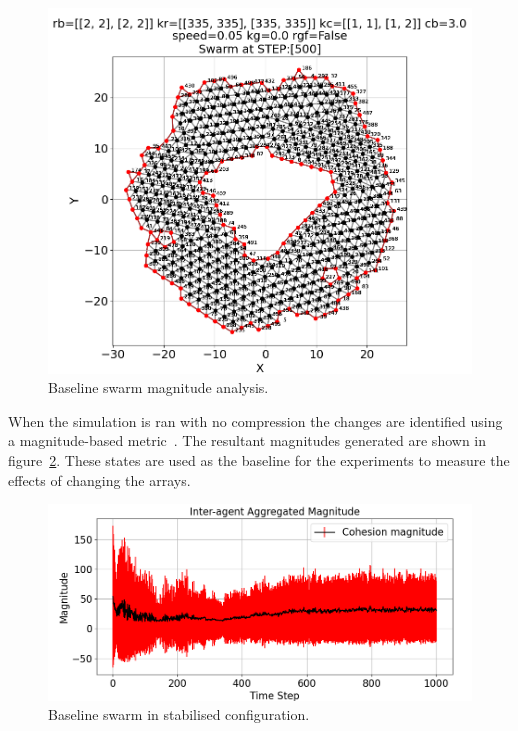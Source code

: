 \documentclass[12pt,a4paper]{IEEEtran}
\begin{document}
\begin{figure}[H]
	\begin{center}
		\includegraphics[width=1.0\linewidth]{figures/baseline}
	\end{center}
	\caption{Baseline swarm magnitude analysis. \label{fig:baselineSwarm}}
\end{figure}

When the simulation is ran with no compression the changes are identified using a magnitude-based metric~\cite{eliot2018metric}. The resultant magnitudes generated are shown in figure~\ref{fig:baselineMagnitude}. These states are used as the baseline for the experiments to measure the effects of changing the arrays.

\begin{figure}[H]
	\begin{center}
		\includegraphics[width=1.0\linewidth]{figures/baselineMagnitude}
	\end{center}
	\caption{Baseline swarm in stabilised configuration. \label{fig:baselineMagnitude}}
\end{figure}
\end{document}
